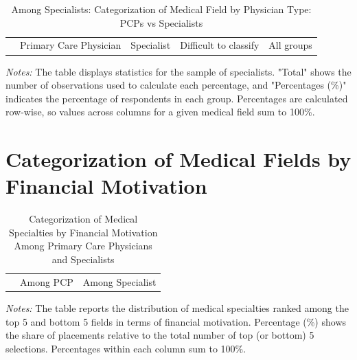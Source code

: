 \documentclass[11pt]{article}
\theoremstyle{definition}
\begin{document}
\begin{table}[H]
    \centering
    \caption{Among Specialists: Categorization of Medical Field by Physician Type: PCPs vs Specialists}
    \begin{adjustbox}{width=0.75\linewidth} 
    \begin{tabular}{lccccccc}\toprule & \multicolumn{2}{c}{Primary Care Physician} & \multicolumn{2}{c}{Specialist} & \multicolumn{2}{c}{Difficult to classify} & \multicolumn{1}{c}{All groups} \\ \cmidrule(lr){2-3} \cmidrule(lr){4-5} \cmidrule(lr){6-7}      
    
    \end{tabular}
    \end{adjustbox}
    \label{tab:med_field_cat_phystype_sp}
          {\parbox{1\linewidth}{           %
    		\scriptsize{{{ \textit{Notes:} The table displays statistics for the sample of specialists. "Total" shows the number of observations used to calculate each percentage, and "Percentages (\%)" indicates the percentage of respondents in each group. Percentages are calculated row-wise, so values across columns for a given medical field sum to 100\%.}}}}}
\end{table}


\section{Categorization of Medical Fields by Financial Motivation} 

\begin{table}[H]
    \centering
    \caption{Categorization of Medical Specialties by Financial Motivation Among Primary Care Physicians and Specialists}
    \begin{adjustbox}{width=0.55\linewidth} 
    \begin{tabular}{lcccc}\toprule & \multicolumn{2}{c}{Among PCP} & \multicolumn{2}{c}{Among Specialist} \\ \cmidrule(lr){2-3} \cmidrule(lr){4-5} 
    
    \end{tabular}
    \end{adjustbox}
    \label{tab:med_field_cat_finmov}
          {\parbox{1\linewidth}{           %
		\scriptsize{{{ \textit{Notes:} The table reports the distribution of medical specialties ranked among the top 5 and bottom 5 fields in terms of financial motivation. Percentage (\%) shows the share of placements relative to the total number of top (or bottom) 5 selections. Percentages within each column sum to 100\%.}}}}}
\end{table}
\end{document}
